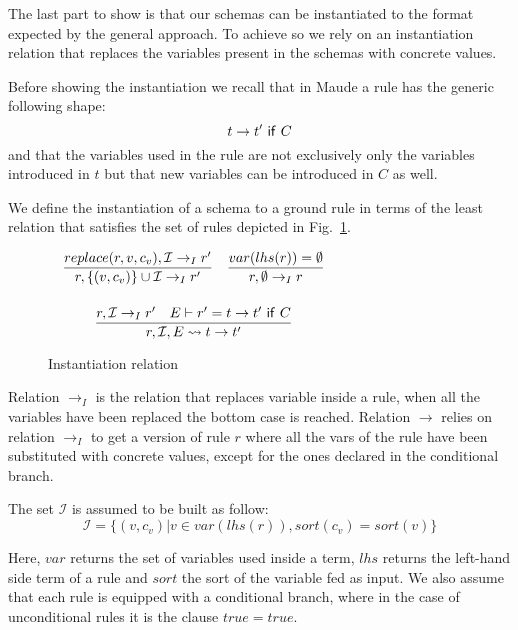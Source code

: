 \documentclass{article}[12pt,a4paper]
\theoremstyle{definition}
\begin{document}
The last part to show is that our schemas can be instantiated to the format
expected by the general approach. To achieve so we rely on an instantiation
relation that replaces the variables present in the schemas with concrete values.

Before showing the instantiation we recall that in Maude a rule has the generic
following shape:
\[t \rightarrow t'~\mathsf{if}~C\]
and that the variables used in the rule are not exclusively only the variables
introduced in $t$ but that new variables can be introduced in $C$ as well.

We define the instantiation of a schema to a ground rule in terms of the least
relation that satisfies the set of rules depicted in Fig.~\ref{fig:inst}.

\begin{figure}
  \centering
  $
  \begin{array}{c}
  \begin{array}{ll}
      \displaystyle
      \frac{replace(r,v,c_v),\mathcal{I}\rightarrow_I r'}
      {r, \{(v,c_v)\}\cup\mathcal{I} \rightarrow_I r'}
    &
      \displaystyle
      \frac{var(lhs(r))=\emptyset}
      {r,\emptyset \rightarrow_I r}
  \end{array}\\[5ex]

  \begin{array}{c}
    \displaystyle
    \frac{r,\mathcal{I}\rightarrow_I r'~~~E\vdash r'=t\rightarrow t'~\ms{if}~C}
    {r, \mathcal{I},E \rightsquigarrow t\rightarrow t'}
  \end{array}
  \end{array}
  $
  \caption{Instantiation relation}
  \label{fig:inst}
\end{figure}

Relation $\rightarrow_I$ is the relation that replaces variable inside a rule,
when all the variables have been replaced the bottom case is reached. Relation
$\rightarrow$ relies on relation $\rightarrow_I$ to get a version of rule $r$
where all the vars of the rule have been substituted with concrete values,
except for the ones declared in the conditional branch.

The set $\mathcal{I}$ is assumed to be built as follow:
\[\mathcal{I}=\{(v,c_v)|v\in var(lhs(r)), sort(c_v)= sort(v)\}\]

Here, $var$ returns the set of variables used inside a term, $lhs$ returns
the left-hand side term of a rule and $sort$ the sort of the variable fed as
input.
We also assume that each rule is equipped with a conditional branch, where in
the case of unconditional rules it is the clause $true=true$.
\end{document}
